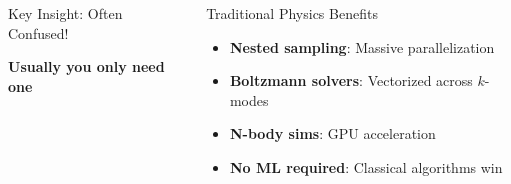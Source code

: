\documentclass[aspectratio=169]{beamer}
\begin{document}
\begin{frame}
\begin{columns}
\begin{block}{Key Insight: Often Confused!}
\begin{center}
                \vspace{5pt}
                \textbf{Usually you only need one}
            \end{center}
        \end{block}
        \begin{block}{Traditional Physics Benefits}
            \begin{itemize}
                \item \textbf{Nested sampling}: Massive parallelization
                \item \textbf{Boltzmann solvers}: Vectorized across $k$-modes
                \item \textbf{N-body sims}: GPU acceleration
                \item \textbf{No ML required}: Classical algorithms win
            \end{itemize}
        \end{block}
    \end{columns}
\end{frame}
\end{document}
